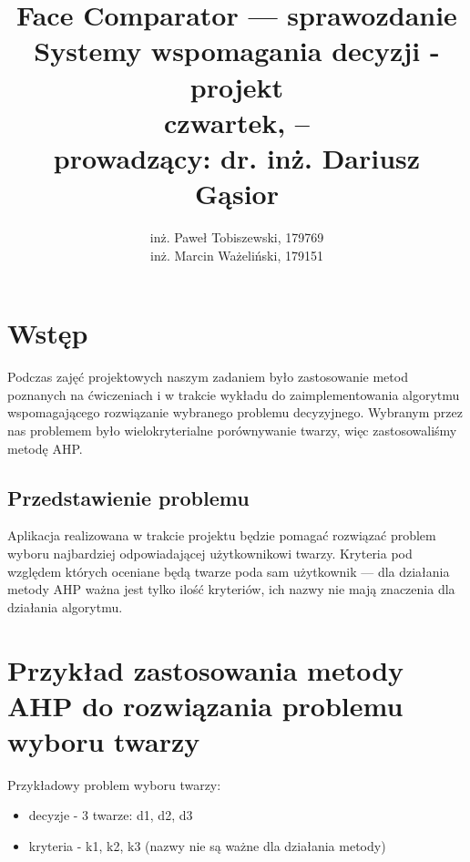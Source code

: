 \documentclass[a4paper,notitlepage]{article}
\author{
	inż. Paweł Tobiszewski, 179769\\
	inż. Marcin Ważeliński, 179151
}
\title{
	\textbf{Face Comparator --- sprawozdanie}\\
	Systemy wspomagania decyzji - projekt\\
	czwartek, \hour{18}{55} -- \hour{20}{30}\\
	prowadzący: dr. inż. Dariusz Gąsior
}
\date{}
\begin{document}
\maketitle

\section{Wstęp}
Podczas zajęć projektowych naszym zadaniem było zastosowanie metod poznanych na ćwiczeniach i w trakcie wykładu do zaimplementowania algorytmu wspomagającego rozwiązanie wybranego problemu decyzyjnego.
Wybranym przez nas problemem było wielokryterialne porównywanie twarzy, więc zastosowaliśmy metodę AHP.

\subsection{Przedstawienie problemu}
Aplikacja realizowana w trakcie projektu będzie pomagać rozwiązać problem wyboru najbardziej odpowiadającej użytkownikowi twarzy.
Kryteria pod względem których oceniane będą twarze poda sam użytkownik --- dla działania metody AHP ważna jest tylko ilość kryteriów, ich nazwy nie mają znaczenia dla działania algorytmu.

\section{Przykład zastosowania metody AHP do rozwiązania problemu wyboru twarzy}

Przykładowy problem wyboru twarzy:
\begin{itemize}
\item decyzje - 3 twarze: d1, d2, d3
\item kryteria - k1, k2, k3 (nazwy nie są ważne dla działania metody)
\end{itemize}
\end{document}
